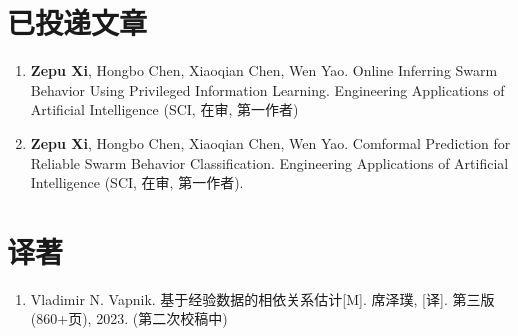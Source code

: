 
\section*{已投递文章}
\begin{enumerate}
\item 
\textbf{Zepu Xi}, Hongbo Chen, Xiaoqian Chen, Wen Yao. 
Online Inferring Swarm Behavior Using Privileged Information Learning. 
Engineering Applications of Artificial Intelligence (SCI, 在审, 第一作者)
\item 
\textbf{Zepu Xi}, Hongbo Chen, Xiaoqian Chen, Wen Yao. 
Comformal Prediction for Reliable Swarm Behavior Classification. 
Engineering Applications of Artificial Intelligence (SCI, 在审, 第一作者).
\end{enumerate}

%
%
%
\section*{译著}
\begin{enumerate}
\item Vladimir N. Vapnik. 基于经验数据的相依关系估计[M]. 席泽璞, [译]. 第三版 (860+页), 2023. (第二次校稿中)
\end{enumerate}

